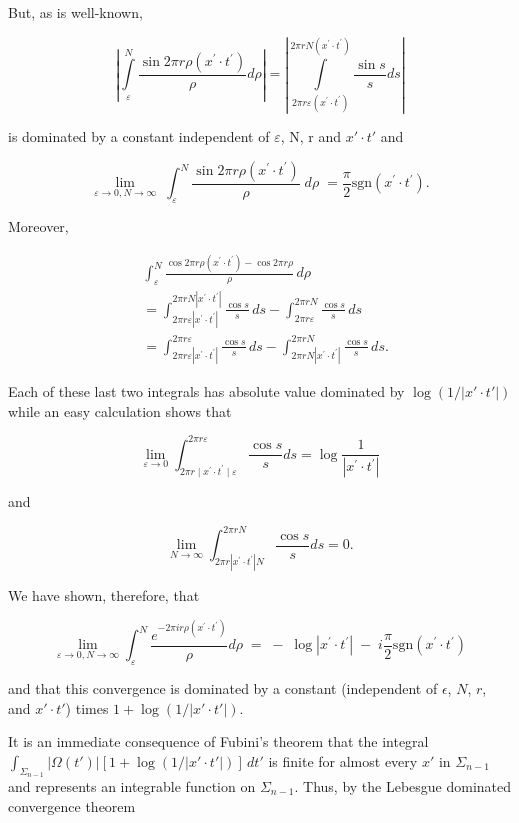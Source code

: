 But, as is well-known,

\[
\left|\int\limits_{\varepsilon}^{N}\frac{\sin2\pi r\rho(x^{\prime}\cdot t^{\prime})}{\rho}d\rho\right|=\left|\int\limits_{2\pi r\varepsilon(x^{\prime}\cdot t^{\prime})}^{2\pi r N(x^{\prime}\cdot t^{\prime})}\frac{\sin s}{s}ds\right|
\]

is dominated by a constant independent of $\varepsilon$, N, r and $x' \cdot t'$ and

\[
\lim_{\varepsilon\to0,N\to\infty}\;\int_{\varepsilon}^{N}\frac{\sin2\pi r\rho(x^{\prime}\cdot t^{\prime})}{\rho}\;d\rho\;=\frac{\pi}{2}\text{sgn}(x^{\prime}\cdot t^{\prime}).
\]

Moreover,

\[
\begin{aligned}&\int_{\varepsilon}^{N}\frac{\cos 2\pi r\rho(x^{\prime}\cdot t^{\prime})-\cos 2\pi r\rho}{\rho}\,d\rho\\
&=\int_{2\pi r\varepsilon|x^{\prime}\cdot t^{\prime}|}^{2\pi rN|x^{\prime}\cdot t^{\prime}|}\frac{\cos s}{s}\,ds-\int_{2\pi r\varepsilon}^{2\pi rN}\frac{\cos s}{s}\,ds\\
&=\int_{2\pi r\varepsilon|x^{\prime}\cdot t^{\prime}|}^{2\pi r\varepsilon}\frac{\cos s}{s}\,ds-\int_{2\pi rN|x^{\prime}\cdot t^{\prime}|}^{2\pi rN}\frac{\cos s}{s}\,ds.\end{aligned}
\]

Each of these last two integrals has absolute value dominated by $\log\left(1/|x' \cdot t'|\right)$ while an easy calculation shows that

\[
\lim_{\varepsilon\to0}\int_{2\pi r\mid x^{\prime}\cdot t^{\prime}\mid\varepsilon}^{2\pi r\varepsilon}\frac{\cos s}{s}ds=\log\frac{1}{\left|x^{\prime}\cdot t^{\prime}\right|}
\]

and

\[
\lim_{N\to\infty}\int_{2\pi r|x^{\prime}\cdot t^{\prime}|N}^{2\pi r N}\frac{\cos s}{s}d s=0.
\]

We have shown, therefore, that

\[
\lim_{\varepsilon\to0,N\to\infty}\int_{\varepsilon}^{N}\frac{e^{-2\pi i r\rho\left(x^{\prime}\cdot t^{\prime}\right)}}{\rho}d\rho\;=\;-\;\log\left|x^{\prime}\cdot t^{\prime}\right|\;-\;i\frac{\pi}{2}\text{sgn}\left(x^{\prime}\cdot t^{\prime}\right)
\]

and that this convergence is dominated by a constant (independent of $\epsilon$, $N$, $r$, and $x' \cdot t'$) times $1 + \log(1/|x' \cdot t'|)$.

It is an immediate consequence of Fubini's theorem that the integral $\int_{\Sigma_{n-1}}|\Omega(t')|[1 + \log (1/|x'\cdot t'|)]\,dt'$ is finite for almost every $x'$ in $\Sigma_{n-1}$ and represents an integrable function on $\Sigma_{n-1}$. Thus, by the Lebesgue dominated convergence theorem

